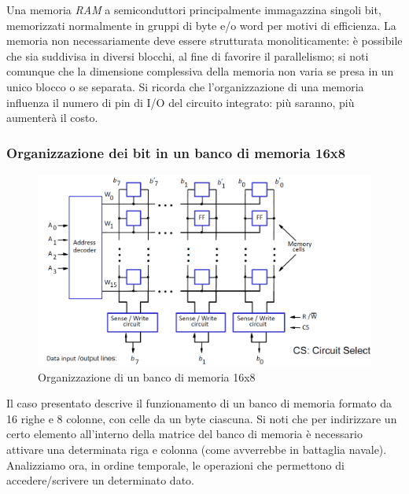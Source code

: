 \documentclass[class=book, crop=false, oneside]{standalone}
\begin{document}
Una memoria \emph{RAM} a semiconduttori principalmente immagazzina singoli bit, memorizzati normalmente in gruppi di byte e/o word per motivi di efficienza. La memoria non necessariamente deve essere strutturata monoliticamente: è possibile che sia suddivisa in diversi blocchi, al fine di favorire il parallelismo; si noti comunque che la dimensione complessiva della memoria non varia se presa in un unico blocco o se separata. Si ricorda che l'organizzazione di una memoria influenza il numero di pin di I/O del circuito integrato: più saranno, più aumenterà il costo.

\subsubsection{Organizzazione dei bit in un banco di memoria 16x8}
\begin{figure}[H]
	\centering
	\includegraphics[width=\textwidth,keepaspectratio]{organizzazione.png}
	\caption{Organizzazione di un banco di memoria 16x8}
\end{figure}
Il caso presentato descrive il funzionamento di un banco di memoria formato da 16 righe e 8 colonne, con celle da un byte ciascuna. Si noti che per indirizzare un certo elemento all'interno della matrice del banco di memoria è necessario attivare una determinata riga e colonna (come avverrebbe in battaglia navale). Analizziamo ora, in ordine temporale, le operazioni che permettono di accedere/scrivere un determinato dato.
\end{document}
